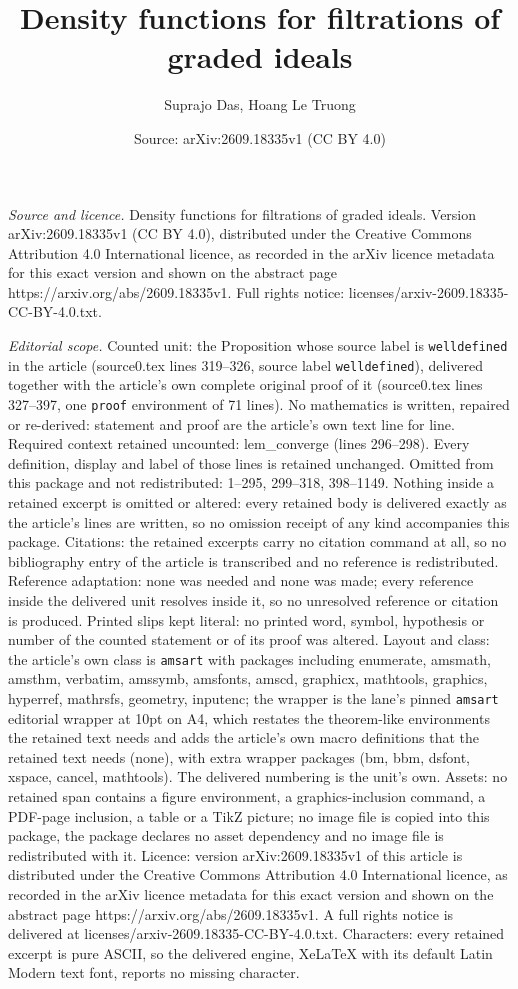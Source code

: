 \documentclass[10pt,a4paper]{amsart}
\title[Density functions for filtrations of graded ideals]{Density functions for filtrations of graded ideals}
\author{Suprajo Das, Hoang Le Truong}
\date{Source: arXiv:2609.18335v1 (CC BY 4.0)}
\begin{document}
\maketitle

\noindent\emph{Source and licence.} Density functions for filtrations of graded ideals. Version arXiv:2609.18335v1 (CC BY 4.0), distributed under the Creative Commons Attribution 4.0 International licence, as recorded in the arXiv licence metadata for this exact version and shown on the abstract page https://arxiv.org/abs/2609.18335v1. Full rights notice: licenses/arxiv-2609.18335-CC-BY-4.0.txt.\par\smallskip

\noindent\textit{Editorial scope.} Counted unit: the Proposition whose source label is \texttt{welldefined} in the article (source0.tex lines 319--326, source label \texttt{welldefined}), delivered together with the article's own complete original proof of it (source0.tex lines 327--397, one \texttt{proof} environment of 71 lines). No mathematics is written, repaired or re-derived: statement and proof are the article's own text line for line. Required context retained uncounted: lem\_converge (lines 296--298). Every definition, display and label of those lines is retained unchanged. Omitted from this package and not redistributed: 1--295, 299--318, 398--1149. Nothing inside a retained excerpt is omitted or altered: every retained body is delivered exactly as the article's lines are written, so no omission receipt of any kind accompanies this package. Citations: the retained excerpts carry no citation command at all, so no bibliography entry of the article is transcribed and no reference is redistributed. Reference adaptation: none was needed and none was made; every reference inside the delivered unit resolves inside it, so no unresolved reference or citation is produced. Printed slips kept literal: no printed word, symbol, hypothesis or number of the counted statement or of its proof was altered. Layout and class: the article's own class is \texttt{amsart} with packages including enumerate, amsmath, amsthm, verbatim, amssymb, amsfonts, amscd, graphicx, mathtools, graphics, hyperref, mathrsfs, geometry, inputenc; the wrapper is the lane's pinned \texttt{amsart} editorial wrapper at 10pt on A4, which restates the theorem-like environments the retained text needs and adds the article's own macro definitions that the retained text needs (none), with extra wrapper packages (bm, bbm, dsfont, xspace, cancel, mathtools). The delivered numbering is the unit's own. Assets: no retained span contains a figure environment, a graphics-inclusion command, a PDF-page inclusion, a table or a TikZ picture; no image file is copied into this package, the package declares no asset dependency and no image file is redistributed with it. Licence: version arXiv:2609.18335v1 of this article is distributed under the Creative Commons Attribution 4.0 International licence, as recorded in the arXiv licence metadata for this exact version and shown on the abstract page https://arxiv.org/abs/2609.18335v1. A full rights notice is delivered at licenses/arxiv-2609.18335-CC-BY-4.0.txt. Characters: every retained excerpt is pure ASCII, so the delivered engine, XeLaTeX with its default Latin Modern text font, reports no missing character.
\end{document}
